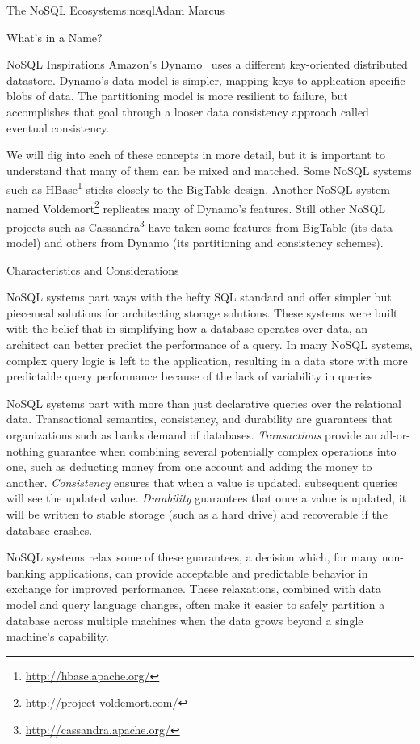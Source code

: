 \begin{aosachapter}{The NoSQL Ecosystem}{s:nosql}{Adam Marcus}
\begin{aosasect1}{What's in a Name?}
\begin{aosasect2}{NoSQL Inspirations}
Amazon's Dynamo~\cite{bib:amazon:dynamo} uses a different key-oriented distributed datastore.
Dynamo's data model is simpler, mapping keys to application-specific
blobs of data.  The partitioning model is more resilient to failure,
but accomplishes that goal through a looser data consistency approach
called eventual consistency.

We will dig into each of these concepts in more detail, but it is
important to understand that many of them can be mixed and matched.
Some NoSQL systems such as HBase\footnote{\url{http://hbase.apache.org/}} sticks closely to the BigTable
design. Another NoSQL system named Voldemort\footnote{\url{http://project-voldemort.com/}} replicates many of
Dynamo's features.  Still other NoSQL projects such as Cassandra\footnote{\url{http://cassandra.apache.org/}} have
taken some features from BigTable (its data model) and others from
Dynamo (its partitioning and consistency schemes).

\end{aosasect2}

\begin{aosasect2}{Characteristics and Considerations}

NoSQL systems part ways with the hefty SQL standard and offer simpler
but piecemeal solutions for architecting storage solutions.  These
systems were built with the belief that in simplifying how a database
operates over data, an architect can better predict the performance of
a query.  In many NoSQL systems, complex query logic is left to the
application, resulting in a data store with more predictable query
performance because of the lack of variability in queries

NoSQL systems part with more than just declarative queries over the
relational data.  Transactional semantics, consistency, and durability
are guarantees that organizations such as banks demand of databases.
\emph{Transactions} provide an all-or-nothing guarantee when combining
several potentially complex operations into one, such as deducting
money from one account and adding the money to another.  \emph{Consistency}
ensures that when a value is updated, subsequent queries will see the
updated value.  \emph{Durability} guarantees that once a value is updated, it
will be written to stable storage (such as a hard drive) and
recoverable if the database crashes.

NoSQL systems relax some of these guarantees, a decision which, for
many non-banking applications, can provide acceptable and predictable
behavior in exchange for improved performance.  These relaxations,
combined with data model and query language changes, often make it
easier to safely partition a database across multiple machines when
the data grows beyond a single machine's capability.


\end{aosasect2}
\end{aosasect1}
\end{aosachapter}
